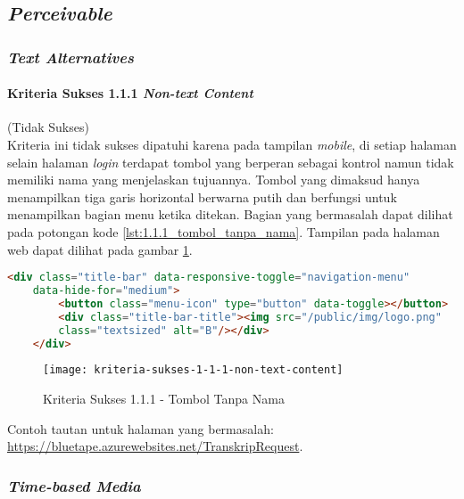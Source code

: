 \subsection{\textit{Perceivable}}
\label{subsec:kepatuhan_bluetape_perceivable}

\subsubsection{\textit{Text Alternatives}}
\label{subsubsec:kepatuhan_bluetape_text_alternatives}

\paragraph{Kriteria Sukses 1.1.1 \textit{Non-text Content}}
\label{par:kepatuhan_bluetape_kriteria_sukses_1.1.1}
(Tidak Sukses)\\

Kriteria ini tidak sukses dipatuhi karena pada tampilan \textit{mobile}, di setiap halaman selain halaman \textit{login} terdapat tombol yang berperan sebagai kontrol namun tidak memiliki nama yang menjelaskan tujuannya. Tombol yang dimaksud hanya menampilkan tiga garis horizontal berwarna putih dan berfungsi untuk menampilkan bagian menu ketika ditekan. Bagian yang bermasalah dapat dilihat pada potongan kode \ref{lst:1.1.1_tombol_tanpa_nama}. Tampilan pada halaman web dapat dilihat pada gambar \ref{fig:1.1.1_non_text_content}.

\begin{lstlisting}[frame=single, label={lst:1.1.1_tombol_tanpa_nama}, language=HTML, caption=Kriteria Sukses 1.1.1 - Tombol Tanpa Nama]
    <div class="title-bar" data-responsive-toggle="navigation-menu" 
    data-hide-for="medium">
        <button class="menu-icon" type="button" data-toggle></button>
        <div class="title-bar-title"><img src="/public/img/logo.png" 
        class="textsized" alt="B"/></div>
    </div>
\end{lstlisting}

\begin{figure}[H]
	\centering  
	\texttt{[image: kriteria-sukses-1-1-1-non-text-content]}  
    \caption[Kriteria Sukses 1.1.1 - Tombol Tanpa Nama]{Kriteria Sukses 1.1.1 - Tombol Tanpa Nama}
    \label{fig:1.1.1_non_text_content}  
\end{figure} 
Contoh tautan untuk halaman yang bermasalah: \url{https://bluetape.azurewebsites.net/TranskripRequest}.

\subsubsection{\textit{Time-based Media}}
\label{subsubsec:kepatuhan_bluetape_time_based_media}


